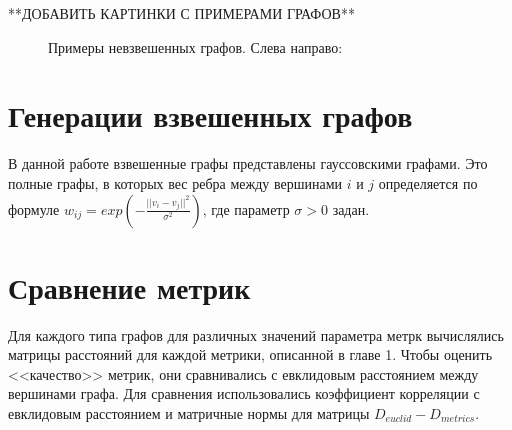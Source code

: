 **ДОБАВИТЬ КАРТИНКИ С ПРИМЕРАМИ ГРАФОВ**
\begin{figure}[h]
  \begin{minipage}[h]{0.29\linewidth}
  \end{minipage}
  \hfill
  \begin{minipage}[h]{0.29\linewidth}
  \end{minipage}
  \hfill
  \begin{minipage}[h]{0.29\linewidth}
  \end{minipage}
  \caption{Примеры невзвешенных графов. Слева направо: }
  \label{img:knuth}  
\end{figure}


\section{Генерации взвешенных графов} \label{sect2_3}

В данной работе взвешенные графы представлены гауссовскими графами. Это полные графы, в которых вес ребра между вершинами $i$ и $j$ определяется по формуле $w_{ij} = exp(-\frac{||v_i - v_j||^2} {\sigma^2} )$, где параметр $\sigma > 0$ задан.


\section{Сравнение метрик} \label{sect2_4}

Для каждого типа графов для различных значений параметра метрк вычислялись матрицы расстояний для каждой метрики, описанной в главе 1. Чтобы оценить <<качество>> метрик, они сравнивались с евклидовым расстоянием между вершинами графа. Для сравнения использовались коэффициент корреляции с евклидовым расстоянием и матричные нормы для матрицы $D_{euclid} - D_{metrics}$.


\clearpage
